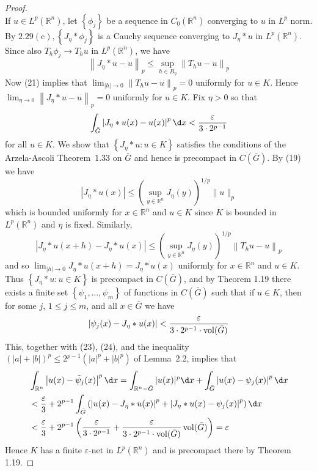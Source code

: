 \begin{proof}
\[  \]
  If $u \in L^p(\mathbb{R}^n)$, let $\left\{\phi_j\right\}$ be a sequence in $C_0(\mathbb{R}^n)$ converging to $u$ in $L^p$ norm. By $2.29(\mathrm{c}),\left\{J_\eta * \phi_j\right\}$ is a Cauchy sequence converging to $J_\eta * u$ in $L^p(\mathbb{R}^n)$. Since also $T_h \phi_j \rightarrow T_h u$ in $L^p(\mathbb{R}^n)$, we have
  \[
  \left\|J_\eta * u-u\right\|_p \leq \sup _{h \in B_\eta}\left\|T_h u-u\right\|_p
  \]
  Now (21) implies that $\lim _{|h| \rightarrow 0}\left\|T_h u-u\right\|_p=0$ uniformly for $u \in K$. Hence $\lim _{\eta \rightarrow 0}\left\|J_\eta * u-u\right\|_p=0$ uniformly for $u \in K$. Fix $\eta>0$ so that
  \[
  \int_{\bar{G}}\left|J_\eta * u(x)-u(x)\right|^p \d x<\frac{\varepsilon}{3 \cdot 2^{p-1}}
  \]
  for all $u \in K$.
  We show that $\left\{J_\eta * u: u \in K\right\}$ satisfies the conditions of the Arzela-Ascoli Theorem~1.33 on $\bar{G}$ and hence is precompact in $C(\bar{G})$. By (19) we have
  \[
  \left|J_\eta * u(x)\right| \leq\left(\sup _{y \in \mathbb{R}^n} J_\eta(y)\right)^{1 / p}\|u\|_p
  \]
  which is bounded uniformly for $x \in \mathbb{R}^n$ and $u \in K$ since $K$ is bounded in $L^p(\mathbb{R}^n)$ and $\eta$ is fixed. Similarly,
  \[
  \left|J_\eta * u(x+h)-J_\eta * u(x)\right| \leq\left(\sup _{y \in \mathbb{R}^n} J_\eta(y)\right)^{1 / p}\left\|T_h u-u\right\|_p
  \]
  and so $\lim _{|h| \rightarrow 0} J_\eta * u(x+h)=J_\eta * u(x)$ uniformly for $x \in \mathbb{R}^n$ and $u \in K$. Thus $\left\{J_\eta * u: u \in K\right\}$ is precompact in $C(\bar{G})$, and by Theorem 1.19 there exists a finite set $\left\{\psi_1, \ldots, \psi_m\right\}$ of functions in $C(\bar{G})$ such that if $u \in K$, then for some $j$, $1 \leq j \leq m$, and all $x \in \bar{G}$ we have
  \[
  \left|\psi_j(x)-J_\eta * u(x)\right|<\frac{\varepsilon}{3 \cdot 2^{p-1} \cdot \operatorname{vol}(\bar{G})}
  \]
  This, together with (23), (24), and the inequality $(|a|+|b|)^p \leq 2^{p-1}\left(|a|^p+|b|^p\right)$ of Lemma~2.2, implies that
  \[
  \begin{aligned}
  & \int_{\mathbb{R}^n}\left|u(x)-\tilde{\psi}_j(x)\right|^p \d x=\int_{\mathbb{R}^n-\bar{G}}|u(x)|^p \d x+\int_{\bar{G}}\left|u(x)-\psi_j(x)\right|^p \d x \\
  &<\frac{\varepsilon}{3}+2^{p-1} \int_{\bar{G}}\left(\left|u(x)-J_\eta * u(x)\right|^p+\left|J_\eta * u(x)-\psi_j(x)\right|^p\right) \d x \\
  &<\frac{\varepsilon}{3}+2^{p-1}\left(\frac{\varepsilon}{3 \cdot 2^{p-1}}+\frac{\varepsilon}{3 \cdot 2^{p-1} \cdot \vol(\bar{G})} \vol(\bar{G})\right)=\varepsilon
  \end{aligned}
  \]
  Hence $K$ has a finite $\varepsilon$-net in $L^p(\mathbb{R}^n)$ and is precompact there by Theorem 1.19.
\end{proof}


